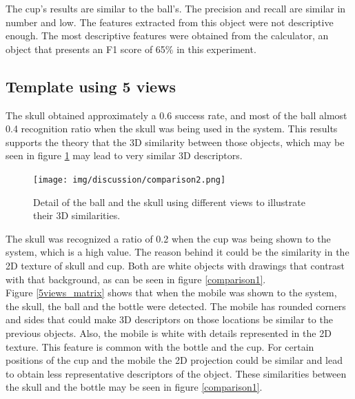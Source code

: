 	The cup's results are similar to the ball's. 
	The precision and recall are similar in number and low. 
	The features extracted from this object were not descriptive enough.
	The most descriptive features were obtained from the calculator, an object that presents an F1 score of 65\% in this experiment. 


	\subsection{Template using 5 views}
	\label{discussion_5views}

	The skull obtained approximately a 0.6 success rate, and most of the ball almost 0.4 recognition ratio when the skull was being used in the system. 
	This results supports the theory that the 3D similarity between those objects, which may be seen in figure \ref{comparison2} may lead to very similar 3D descriptors. 

\vspace{0.5cm}
	\begin{figure}[h]
		\begin{center}
	    \texttt{[image: img/discussion/comparison2.png]}
		\caption[Comparison: ball and skull]{Detail of the ball and the skull using different views to illustrate their 3D similarities. }
		\label{comparison2}
		\end{center}
	\end{figure}


\vspace{0.5cm}
	The skull was recognized a ratio of 0.2 when the cup was being shown to the system, which is a high value. 
	The reason behind it could be the similarity in the 2D texture of skull and cup. 
	Both are white objects with drawings that contrast with that background, as can be seen in figure \ref{comparison1}. 
	\\
	
	Figure \ref{5views_matrix} shows that when the mobile was shown to the system, the skull, the ball and the bottle were detected. 
	The mobile has rounded corners and sides that could make 3D descriptors on those locations be similar to the previous objects. 
	Also, the mobile is white with details represented in the 2D texture. 
	This feature is common with the bottle and the cup. 
	For certain positions of the cup and the mobile the 2D projection could be similar and lead to obtain less representative descriptors of the object. 
	These similarities between the skull and the bottle may be seen in figure \ref{comparison1}.

